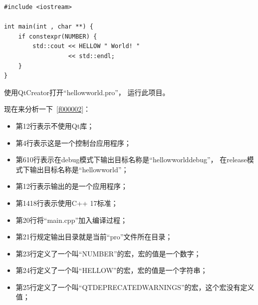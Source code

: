 \begin{lstlisting}[label=f000003,
caption=GoodLuck,
title=\lstlistingname\ \thelstlisting
]
#include <iostream>

int main(int , char **) {
    if constexpr(NUMBER) {
        std::cout << HELLOW " World! "
                  << std::endl;
    }
}
\end{lstlisting}          %


使用QtCreator打开“hellow\underline{\hspace{0.5em}}world.pro”，
运行此项目。

现在来分析一下\lstlistingname\ \ref{f000002}：
\begin{itemize}
\item 第1\raisebox{0.16ex}{\sourcefonttwo\~{}}2行表示不使用Qt库；
\item 第4行表示这是一个控制台应用程序；
\item 第6\raisebox{0.16ex}{\sourcefonttwo\~{}}10行表示在debug模式下输出目标名称是“hellow\underline{\hspace{0.5em}}world\underline{\hspace{0.5em}}debug”，
在release模式下输出目标名称是“hellow\underline{\hspace{0.5em}}world”；
\item 第12行表示输出的是一个应用程序；
\item 第14\raisebox{0.16ex}{\sourcefonttwo\~{}}18行表示使用C{\sourcefonttwo{}+}{\sourcefonttwo{}+} 17标准；
\item 第20行将“main.cpp”加入编译过程；
\item 第21行规定输出目录就是当前“pro”文件所在目录；
\item 第23行定义了一个叫“NUMBER”的宏，宏的值是一个数字；
\item 第24行定义了一个叫“HELLOW”的宏，宏的值是一个字符串；
\item 第25行定义了一个叫“QT\underline{\hspace{0.5em}}DEPRECATED\underline{\hspace{0.5em}}WARNINGS”的宏，这个宏没有定义值；
\end{itemize}

